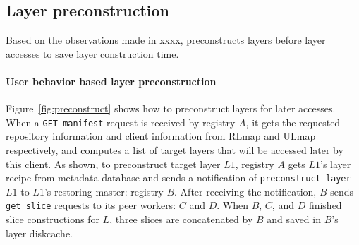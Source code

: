 
\subsection{Layer preconstruction}
\label{sec:cache-design}




Based on the observations made in xxxx,
\sysname preconstructs layers before layer accesses to save layer construction time.

\paragraph{User behavior based layer preconstruction}


Figure~\ref{fig:preconstruct}
shows how to preconstruct layers for later accesses.
When a \texttt{GET manifest} request is received by registry $A$,
it gets the requested repository information and client information from RLmap and ULmap respectively, 
and computes a list of target layers that will be accessed later by this client.
As shown, to preconstruct target layer $L1$, 
registry $A$ gets $L1$'s layer recipe from metadata database
and sends a notification of \texttt{preconstruct layer} $L1$ to 
$L1$'s restoring master: registry $B$. 
After receiving the notification, 
$B$ sends \texttt{get slice} requests to its peer workers: $C$ and $D$.
When $B$, $C$, and $D$ finished slice constructions for $L$,
three slices are concatenated by $B$ and saved in $B$'s layer diskcache. 

